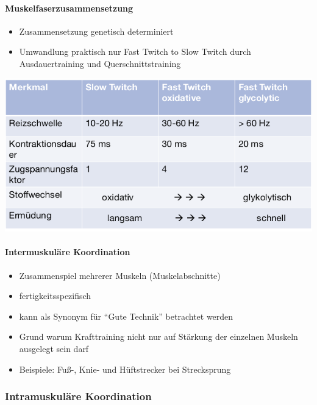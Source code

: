 \paragraph{Muskelfaserzusammensetzung}
\begin{itemize}
    \item Zusammensetzung genetisch determiniert
    \item Umwandlung praktisch nur Fast Twitch to Slow Twitch durch Ausdauertraining und Querschnittstraining
\end{itemize}
\includegraphics[width=\textwidth]{pictures/muskelfaserzusammensetzung}

\paragraph{Intermuskuläre Koordination}
\begin{itemize}
    \item Zusammenspiel mehrerer Muskeln (Muskelabschnitte)
    \item fertigkeitsspezifisch
    \item kann als Synonym für ``Gute Technik'' betrachtet werden
    \item Grund warum Krafttraining nicht nur auf Stärkung der einzelnen Muskeln ausgelegt sein darf
    \item Beispiele: Fuß-, Knie- und Hüftstrecker bei Strecksprung
\end{itemize}

\subsubsection*{Intramuskuläre Koordination}

